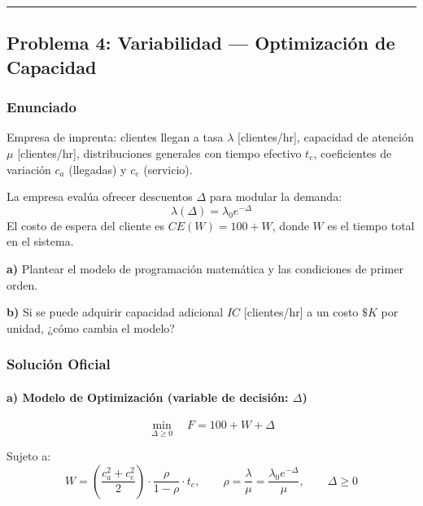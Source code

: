 \documentclass[
]{article}
\begin{document}
\begin{center}\rule{0.5\linewidth}{0.5pt}\end{center}

\hypertarget{problema-4-variabilidad-optimizaciuxf3n-de-capacidad}{%
\subsection{Problema 4: Variabilidad --- Optimización de
Capacidad}\label{problema-4-variabilidad-optimizaciuxf3n-de-capacidad}}

\hypertarget{enunciado-3}{%
\subsubsection{Enunciado}\label{enunciado-3}}

Empresa de imprenta: clientes llegan a tasa \(\lambda\)
{[}clientes/hr{]}, capacidad de atención \(\mu\) {[}clientes/hr{]},
distribuciones generales con tiempo efectivo \(t_e\), coeficientes de
variación \(c_a\) (llegadas) y \(c_e\) (servicio).

La empresa evalúa ofrecer descuentos \(\Delta\) para modular la demanda:
\[\lambda(\Delta) = \lambda_0 e^{-\Delta}\] El costo de espera del
cliente es \(CE(W) = 100 + W\), donde \(W\) es el tiempo total en el
sistema.

\textbf{a)} Plantear el modelo de programación matemática y las
condiciones de primer orden.

\textbf{b)} Si se puede adquirir capacidad adicional \(IC\)
{[}clientes/hr{]} a un costo \(\$K\) por unidad, ¿cómo cambia el modelo?

\hypertarget{soluciuxf3n-oficial-3}{%
\subsubsection{Solución Oficial}\label{soluciuxf3n-oficial-3}}

\hypertarget{a-modelo-de-optimizaciuxf3n-variable-de-decisiuxf3n-delta}{%
\paragraph{\texorpdfstring{a) Modelo de Optimización (variable de
decisión:
\(\Delta\))}{a) Modelo de Optimización (variable de decisión: \textbackslash Delta)}}\label{a-modelo-de-optimizaciuxf3n-variable-de-decisiuxf3n-delta}}

\[\min_{\Delta \ge 0} \quad F = 100 + W + \Delta\]

Sujeto a:
\[W = \left(\frac{c_a^2 + c_e^2}{2}\right) \cdot \frac{\rho}{1 - \rho} \cdot t_e, \qquad \rho = \frac{\lambda}{\mu} = \frac{\lambda_0 e^{-\Delta}}{\mu}, \qquad \Delta \ge 0\]
\end{document}
